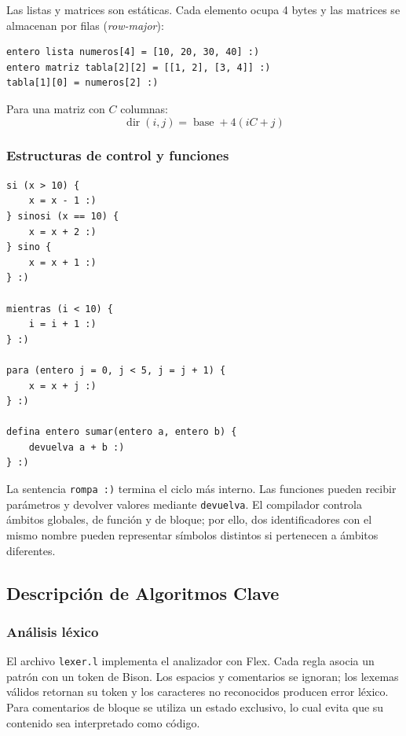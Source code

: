 \documentclass[11pt,letterpaper]{article}
\begin{document}
Las listas y matrices son estáticas. Cada elemento ocupa 4 bytes y las matrices se almacenan por filas (\textit{row-major}):

\begin{lstlisting}[style=codigo]
entero lista numeros[4] = [10, 20, 30, 40] :)
entero matriz tabla[2][2] = [[1, 2], [3, 4]] :)
tabla[1][0] = numeros[2] :)
\end{lstlisting}

Para una matriz con $C$ columnas:
\[
\operatorname{dir}(i,j)=\operatorname{base}+4(iC+j)
\]

\subsubsection{Estructuras de control y funciones}

\begin{lstlisting}[style=codigo]
si (x > 10) {
    x = x - 1 :)
} sinosi (x == 10) {
    x = x + 2 :)
} sino {
    x = x + 1 :)
} :)

mientras (i < 10) {
    i = i + 1 :)
} :)

para (entero j = 0, j < 5, j = j + 1) {
    x = x + j :)
} :)

defina entero sumar(entero a, entero b) {
    devuelva a + b :)
} :)
\end{lstlisting}

La sentencia \texttt{rompa :)} termina el ciclo más interno. Las funciones pueden recibir parámetros y devolver valores mediante \texttt{devuelva}. El compilador controla ámbitos globales, de función y de bloque; por ello, dos identificadores con el mismo nombre pueden representar símbolos distintos si pertenecen a ámbitos diferentes.

\subsection{Descripción de Algoritmos Clave}

\subsubsection{Análisis léxico}

El archivo \texttt{lexer.l} implementa el analizador con Flex. Cada regla asocia un patrón con un token de Bison. Los espacios y comentarios se ignoran; los lexemas válidos retornan su token y los caracteres no reconocidos producen error léxico. Para comentarios de bloque se utiliza un estado exclusivo, lo cual evita que su contenido sea interpretado como código.
\end{document}
